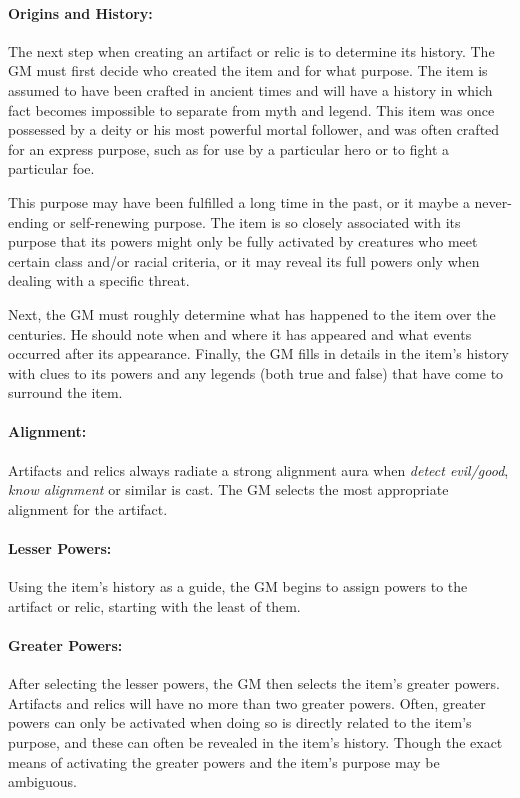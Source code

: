 \begin{multicols}{2}
\paragraph{Origins and History:} The next step when creating an artifact or relic is to determine its history.  The GM must first decide who created the item and for what purpose.  The item is assumed to have been crafted in ancient times and will have a history in which fact becomes impossible to separate from myth and legend.  This item was once possessed by a deity or his most powerful mortal follower, and was often crafted for an express purpose, such as for use by a particular hero or to fight a particular foe.  

This purpose may have been fulfilled a long time in the past, or it maybe a never-ending or self-renewing purpose.  The item is so closely associated with its purpose that its powers might only be fully activated by creatures who meet certain class and/or racial criteria, or it may reveal its full powers only when dealing with a specific threat.

Next, the GM must roughly determine what has happened to the item over the centuries.  He should note when and where it has appeared and what events occurred after its appearance.  Finally, the GM fills in details in the item's history with clues to its powers and any legends (both true and false) that have come to surround the item.  

\paragraph{Alignment:} Artifacts and relics always radiate a strong alignment aura when \textit{detect evil/good}, \textit{know alignment} or similar is cast.  The GM selects the most appropriate alignment for the artifact.

\paragraph{Lesser Powers:} Using the item's history as a guide, the GM begins to assign powers to the artifact or relic, starting with the least of them.  

\paragraph{ Greater Powers:} After selecting the lesser powers, the GM then selects the item's greater powers.  Artifacts and relics will have no more than two greater powers.  Often, greater powers can only be activated when doing so is directly related to the item's purpose, and these can often be revealed in the item's history.  Though the exact means of activating the greater powers and the item's purpose may be ambiguous.  


\end{multicols}
